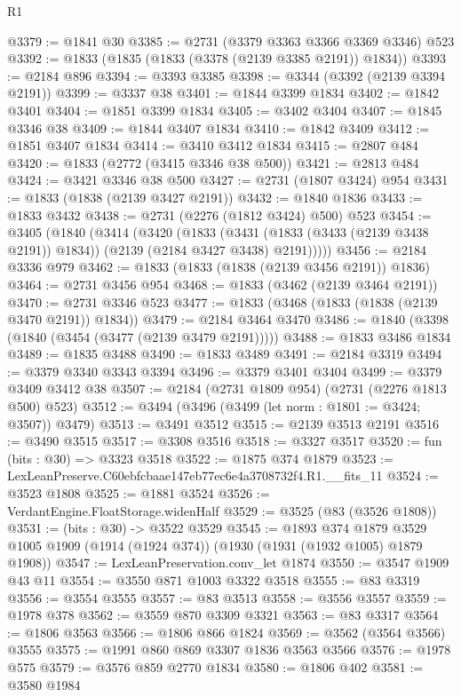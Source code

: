 \begin{lexlean}{R1}
\begin{coremodule}
@3379 := @1841 @30
@3385 := @2731 (@3379 @3363 @3366 @3369 @3346) @523
@3392 := @1833 (@1835 (@1833 (@3378 (@2139 @3385 @2191)) @1834))
@3393 := @2184 @896
@3394 := @3393 @3385
@3398 := @3344 (@3392 (@2139 @3394 @2191))
@3399 := @3337 @38
@3401 := @1844 @3399 @1834
@3402 := @1842 @3401
@3404 := @1851 @3399 @1834
@3405 := @3402 @3404
@3407 := @1845 @3346 @38
@3409 := @1844 @3407 @1834
@3410 := @1842 @3409
@3412 := @1851 @3407 @1834
@3414 := @3410 @3412 @1834
@3415 := @2807 @484
@3420 := @1833 (@2772 (@3415 @3346 @38 @500))
@3421 := @2813 @484
@3424 := @3421 @3346 @38 @500
@3427 := @2731 (@1807 @3424) @954
@3431 := @1833 (@1838 (@2139 @3427 @2191))
@3432 := @1840 @1836
@3433 := @1833 @3432
@3438 := @2731 (@2276 (@1812 @3424) @500) @523
@3454 := @3405
    (@1840
      (@3414
        (@3420
          (@1833
            (@3431 (@1833 (@3433 (@2139 @3438 @2191)) @1834))
            (@2139 (@2184 @3427 @3438) @2191)))))
@3456 := @2184 @3336 @979
@3462 := @1833 (@1833 (@1838 (@2139 @3456 @2191)) @1836)
@3464 := @2731 @3456 @954
@3468 := @1833 (@3462 (@2139 @3464 @2191))
@3470 := @2731 @3346 @523
@3477 := @1833 (@3468 (@1833 (@1838 (@2139 @3470 @2191)) @1834))
@3479 := @2184 @3464 @3470
@3486 := @1840 (@3398 (@1840 (@3454 (@3477 (@2139 @3479 @2191)))))
@3488 := @1833 @3486 @1834
@3489 := @1835 @3488
@3490 := @1833 @3489
@3491 := @2184 @3319
@3494 := @3379 @3340 @3343 @3394
@3496 := @3379 @3401 @3404
@3499 := @3379 @3409 @3412 @38
@3507 := @2184 (@2731 @1809 @954) (@2731 (@2276 @1813 @500) @523)
@3512 := @3494 (@3496 (@3499 (let norm : @1801 := @3424; @3507)) @3479)
@3513 := @3491 @3512
@3515 := @2139 @3513 @2191
@3516 := @3490 @3515
@3517 := @3308 @3516
@3518 := @3327 @3517
@3520 := fun (bits : @30) => @3323 @3518
@3522 := @1875 @374 @1879
@3523 := LexLeanPreserve.C60ebfcbaae147eb77ec6e4a3708732f4.R1.__fits_11
@3524 := @3523 @1808
@3525 := @1881 @3524
@3526 := VerdantEngine.FloatStorage.widenHalf
@3529 := @3525 (@83 (@3526 @1808))
@3531 := (bits : @30) -> @3522 @3529
@3545 := @1893
    @374
    @1879
    @3529
    @1005
    @1909
    (@1914 (@1924 @374))
    (@1930 (@1931 (@1932 @1005) @1879 @1908))
@3547 := LexLeanPreservation.conv_let @1874
@3550 := @3547 @1909 @43 @11
@3554 := @3550 @871 @1003 @3322 @3518
@3555 := @83 @3319
@3556 := @3554 @3555
@3557 := @83 @3513
@3558 := @3556 @3557
@3559 := @1978 @378
@3562 := @3559 @870 @3309 @3321
@3563 := @83 @3317
@3564 := @1806 @3563
@3566 := @1806 @866 @1824
@3569 := @3562 (@3564 @3566) @3555
@3575 := @1991 @860 @869 @3307 @1836 @3563 @3566
@3576 := @1978 @575
@3579 := @3576 @859 @2770 @1834
@3580 := @1806 @402
@3581 := @3580 @1984

\end{coremodule}
\end{lexlean}
